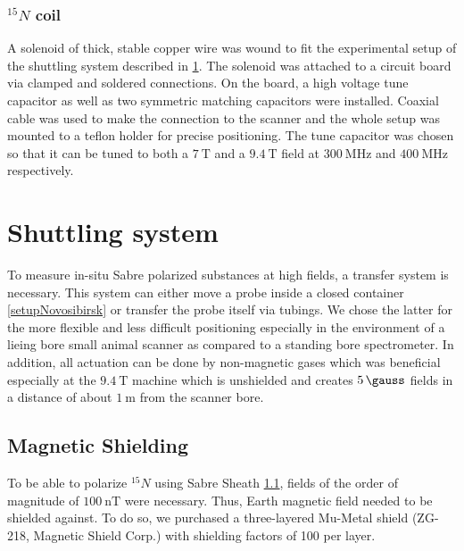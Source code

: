 			\subsubsection{$^{15}N$ coil}
				A solenoid of thick, stable copper wire was wound to fit the experimental setup of
				the shuttling system described in \ref{sec:shuttlingSystem}. The solenoid was
				attached to a circuit board via clamped and soldered connections. On the board, a
				high voltage tune capacitor as well as two symmetric matching capacitors were
				installed. Coaxial cable was used to make the connection to the scanner and the
				whole setup was mounted to a teflon holder for precise positioning.
				The tune capacitor was chosen so that it can be tuned to both a $\SI{7}{\tesla}$ and
				a $\SI{9.4}{\tesla}$ field at $\SI{300}{\MHz}$ and $\SI{400}{\MHz}$ respectively.
				
	\section{Shuttling system}\label{sec:shuttlingSystem}
		To measure in-situ Sabre polarized substances at high fields, a transfer system is
		necessary. This system can either move a probe inside a closed container
		\ref{setupNovosibirsk} or transfer the probe itself via tubings. We chose the latter for the
		more flexible and less difficult positioning especially in the environment of a lieing bore
		small animal scanner as compared to a standing bore spectrometer. In addition, all actuation
		can be done by non-magnetic gases which was beneficial especially at the $\SI{9.4}{\tesla}$
		machine which is unshielded and creates $\SI{5}{\gauss}$ fields in a distance of about $\SI{1}{\meter}$ from
		the scanner bore.
		\subsection{Magnetic Shielding}
			To be able to polarize $^{15}N$ using Sabre Sheath \ref{}, fields of the order of
			magnitude of $\SI{100}{\nano\tesla}$ were necessary. Thus, Earth magnetic field needed to
			be shielded against. To do so, we purchased a three-layered Mu-Metal shield (ZG-218, Magnetic
			Shield Corp.) with shielding factors of 100 per layer.
